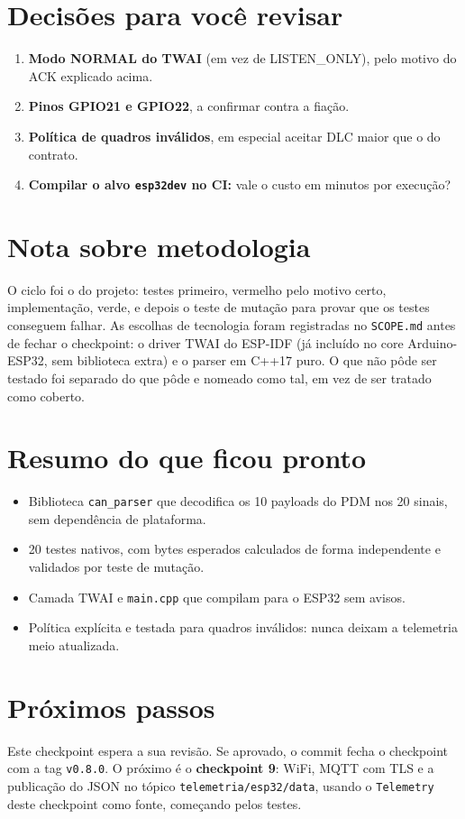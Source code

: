 \documentclass[11pt,a4paper]{article}
\begin{document}
\section{Decisões para você revisar}

\begin{enumerate}
    \item \textbf{Modo NORMAL do TWAI} (em vez de LISTEN\_ONLY), pelo motivo do ACK explicado acima.
    \item \textbf{Pinos GPIO21 e GPIO22}, a confirmar contra a fiação.
    \item \textbf{Política de quadros inválidos}, em especial aceitar DLC maior que o do contrato.
    \item \textbf{Compilar o alvo \texttt{esp32dev} no CI:} vale o custo em minutos por execução?
\end{enumerate}

\section{Nota sobre metodologia}

O ciclo foi o do projeto: testes primeiro, vermelho pelo motivo certo, implementação, verde, e depois o teste de mutação para provar que os testes conseguem falhar. As escolhas de tecnologia foram registradas no \texttt{SCOPE.md} antes de fechar o checkpoint: o driver TWAI do ESP-IDF (já incluído no core Arduino-ESP32, sem biblioteca extra) e o parser em C++17 puro. O que não pôde ser testado foi separado do que pôde e nomeado como tal, em vez de ser tratado como coberto.

\section{Resumo do que ficou pronto}

\begin{itemize}
    \item Biblioteca \texttt{can\_parser} que decodifica os 10 payloads do PDM nos 20 sinais, sem dependência de plataforma.
    \item 20 testes nativos, com bytes esperados calculados de forma independente e validados por teste de mutação.
    \item Camada TWAI e \texttt{main.cpp} que compilam para o ESP32 sem avisos.
    \item Política explícita e testada para quadros inválidos: nunca deixam a telemetria meio atualizada.
\end{itemize}

\section{Próximos passos}

Este checkpoint espera a sua revisão. Se aprovado, o commit fecha o checkpoint com a tag \texttt{v0.8.0}. O próximo é o \textbf{checkpoint 9}: WiFi, MQTT com TLS e a publicação do JSON no tópico \texttt{telemetria/esp32/data}, usando o \texttt{Telemetry} deste checkpoint como fonte, começando pelos testes.
\end{document}
